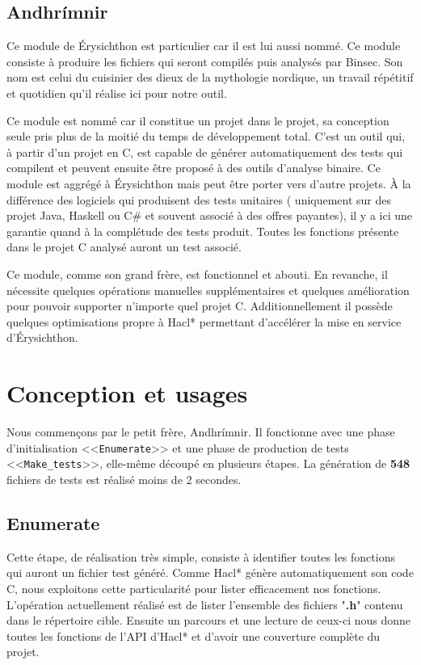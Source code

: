 \subsection*{Andhrímnir}

Ce module de Érysichthon est particulier car il est lui aussi nommé. Ce module consiste à produire les fichiers qui seront compilés puis analysés par Binsec. Son nom est celui du cuisinier des dieux de la mythologie nordique, un travail répétitif et quotidien qu'il réalise ici pour notre outil.\smallbreak

Ce module est nommé car il constitue un projet dans le projet, sa conception seule pris plus de la moitié du temps de développement total. C'est un outil qui, à partir d'un projet en C, est capable de générer automatiquement des tests qui compilent et peuvent ensuite être proposé à des outils d'analyse binaire. Ce module est aggrégé à Érysichthon mais peut être porter vers d'autre projets. À la différence des logiciels qui produisent des tests unitaires ( uniquement sur des projet Java, Haskell ou C\# et souvent associé à des offres payantes), il y a ici une garantie quand à la complétude des tests produit. Toutes les fonctions présente dans le projet C analysé auront un test associé.\smallbreak

Ce module, comme son grand frère, est fonctionnel et abouti. En revanche, il nécessite quelques opérations manuelles supplémentaires et quelques amélioration pour pouvoir supporter n'importe quel projet C. Additionnellement il possède quelques optimisations propre à Hacl* permettant d'accélérer la mise en service d'Érysichthon.

\section{Conception et usages}

Nous commençons par le petit frère, Andhrímnir. Il fonctionne avec une phase d'initialisation <<\texttt{Enumerate}>> et une phase de production de tests <<\texttt{Make\_tests}>>, elle-même découpé en plusieurs étapes. La génération de \textbf{548} fichiers de tests est réalisé moins de 2 secondes.\smallbreak

\subsection*{Enumerate}

Cette étape, de réalisation très simple, consiste à identifier toutes les fonctions qui auront un fichier test généré. Comme Hacl* génère automatiquement son code C, nous exploitons cette particularité pour lister efficacement nos fonctions. L'opération actuellement réalisé est de lister l'ensemble des fichiers "\textbf{.h}" contenu dans le répertoire cible. Ensuite un parcours et une lecture de ceux-ci nous donne toutes les fonctions de l'API d'Hacl* et d'avoir une couverture complète du projet.\smallbreak

